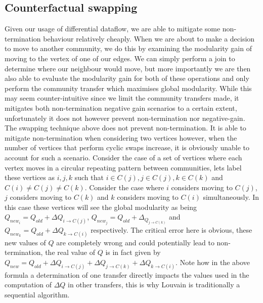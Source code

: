 \subsection{Counterfactual swapping}
Given our usage of differential dataflow, we are able to mitigate some non-termination behaviour relatively cheaply. When we are about to make a decision to move to another community, we do this by examining the modularity gain of moving to the vertex of one of our edges. We can simply perform a join to determine where our neighbour would move, but more importantly we are then also able to evaluate the modularity gain for both of these operations and only perform the community transfer which maximises global modularity. While this may seem counter-intuitive since we limit the community transfers made, it mitigates both non-termination negative gain scenarios to a certain extent, unfortunately it does not however prevent non-termination nor negative-gain. 
The swapping technique above does not prevent non-termination. It is able to mitigate non-termination when considering two vertices however, when the number of vertices that perform cyclic swaps increase, it is obviously unable to account for such a scenario. Consider the case of a set of vertices where each vertex moves in a circular repeating pattern between communities, lets label these vertices as $i,j,k$ such that $i \in C(j),j \in C(j), k \in C(k)$ and $C(i) \neq C(j) \neq C(k)$. Consider the case where $i$ considers moving to $C(j)$, $j$ considers moving to $C(k)$ and $k$ considers moving to $C(i)$ simultaneously. In this case these vertices will see the global modularity as being $Q_{new_i} = Q_{old} + \Delta{Q_{i \rightarrow C(j)}}$, $Q_{new_j} = Q_{old} + \Delta_{Q_{j \rightarrow C(k)}}$ and $Q_{new_k} = Q_{old} + \Delta{Q_{k \rightarrow C(i)}}$ respectively. The critical error here is obvious, these new values of $Q$ are completely wrong and could potentially lead to non-termination, the real value of $Q$ is in fact given by $Q_{new} = Q_{old} + \Delta{Q_{i \rightarrow C(j)}} + \Delta{Q_{j \rightarrow C(k)}} + \Delta{Q_{k \rightarrow C(i)}}$. Note how in the above formula a determination of one transfer directly impacts the values used in the computation of $\Delta{Q}$ in other transfers, this is why Louvain is traditionally a sequential algorithm. 

